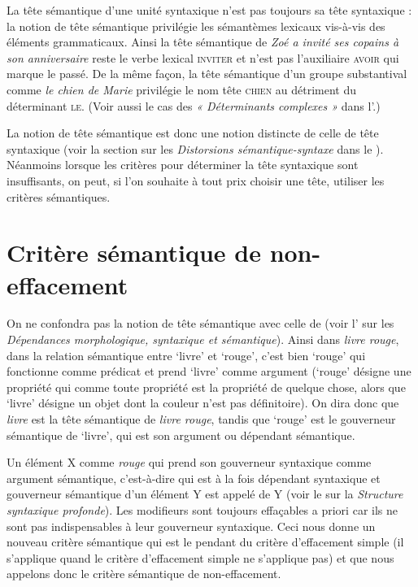 \begin{sloppypar}
La tête sémantique d’une unité syntaxique n’est pas toujours sa tête syntaxique : la notion de tête sémantique privilégie les sémantèmes lexicaux vis-à-vis des éléments grammaticaux. Ainsi la tête sémantique de \textit{Zoé a invité ses copains à son anniversaire} reste le verbe lexical \textsc{inviter} et n’est pas l’auxiliaire \textsc{avoir} qui marque le passé. De la même façon, la tête sémantique d’un groupe substantival comme \textit{le chien de Marie} privilégie le nom tête \textsc{chien} au détriment du déterminant \textsc{le}. (Voir aussi le cas des \textit{« Déterminants complexes »}
dans l'.)
\end{sloppypar}

La notion de tête sémantique est donc une notion distincte de celle de tête syntaxique (voir la section sur les \textit{Distorsions sémantique-syntaxe} dans le ). Néanmoins lorsque les critères pour déterminer la tête syntaxique sont insuffisants, on peut, si l’on souhaite à tout prix choisir une tête, utiliser les critères sémantiques.

\section{Critère sémantique de non-effacement}\label{sec:3.3.18}

On ne confondra pas la notion de tête sémantique avec celle de  (voir l’ sur les \textit{Dépendances morphologique, syntaxique et sémantique}). 
Ainsi dans \textit{livre rouge}, dans la relation sémantique entre ‘livre’ et ‘rouge’, c’est bien ‘rouge’ qui fonctionne comme prédicat et prend ‘livre’ comme argument (‘rouge’ désigne une propriété qui comme toute propriété est la propriété de quelque chose, alors que ‘livre’ désigne un objet dont la couleur n’est pas définitoire). On dira donc que \textit{livre} est la tête sémantique de \textit{livre rouge}, tandis que ‘rouge’ est le gouverneur sémantique de ‘livre’, qui est son argument ou dépendant sémantique.

Un élément X comme \textit{rouge} qui prend son gouverneur syntaxique comme argument sémantique, c’est-à-dire qui est à la fois dépendant syntaxique et gouverneur sémantique d’un élément Y est appelé  de Y (voir le  sur la \textit{Structure syntaxique profonde}). Les modifieurs sont toujours effaçables a priori car ils ne sont pas indispensables à leur gouverneur syntaxique. Ceci nous donne un nouveau critère sémantique qui est le pendant du critère d’effacement simple (il s’applique quand le critère d’effacement simple ne s’applique pas) et que nous appelons donc le critère sémantique de non-effacement.

